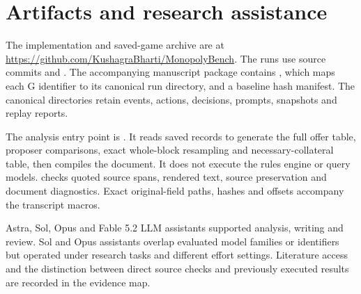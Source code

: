 \section{Artifacts and research assistance}
\label{app:artifacts}\label{app:provenance}
The implementation and saved-game archive are at \url{https://github.com/KushagraBharti/MonopolyBench}. The runs use source commits  and . The accompanying manuscript package contains , which maps each G identifier to its canonical run directory, and a baseline hash manifest. The canonical directories retain events, actions, decisions, prompts, snapshots and replay reports.



The analysis entry point is . It reads saved records to generate the full offer table, proposer comparisons, exact whole-block resampling and necessary-collateral table, then compiles the document. It does not execute the rules engine or query models.  checks quoted source spans, rendered text, source preservation and document diagnostics. Exact original-field paths, hashes and offsets accompany the transcript macros.

Astra, Sol, Opus and Fable 5.2 LLM assistants supported analysis, writing and review. Sol and Opus assistants overlap evaluated model families or identifiers but operated under research tasks and different effort settings. Literature access and the distinction between direct source checks and previously executed results are recorded in the evidence map.
